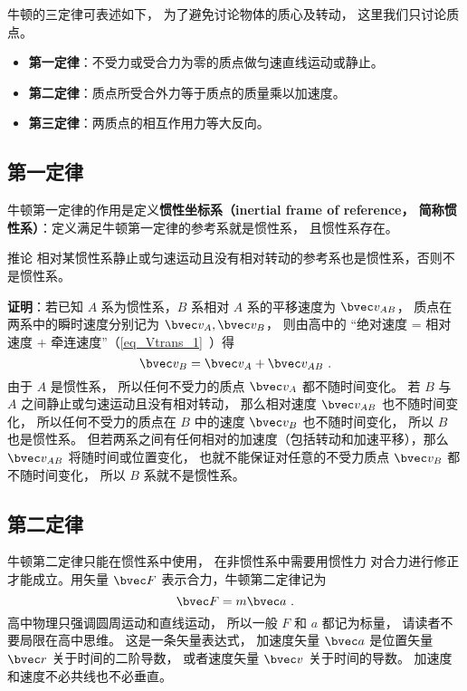 

牛顿的三定律可表述如下， 为了避免讨论物体的质心及转动， 这里我们只讨论质点。
\begin{itemize}
\item \textbf{第一定律}：不受力或受合力为零的质点做匀速直线运动或静止。
\item \textbf{第二定律}：质点所受合外力等于质点的质量乘以加速度。
\item \textbf{第三定律}：两质点的相互作用力等大反向。
\end{itemize}

\subsection{第一定律}

牛顿第一定律的作用是定义\textbf{惯性坐标系（inertial frame of reference， 简称惯性系）}：定义满足牛顿第一定律的参考系就是惯性系， 且惯性系存在。

\begin{corollary}{推论}
相对某惯性系静止或匀速运动且没有相对转动的参考系也是惯性系，否则不是惯性系。
\end{corollary}
\textbf{证明}：若已知 $A$ 系为惯性系，$B$ 系相对 $A$ 系的平移速度为 $\bvec v_{AB}$， 质点在两系中的瞬时速度分别记为 $\bvec v_A, \bvec v_B$， 则由高中的 “绝对速度 = 相对速度 + 牵连速度”（\autoref{eq_Vtrans_1}~）得
\begin{equation}
\bvec v_{B} = \bvec v_{A} + \bvec v_{AB}~.
\end{equation}
由于 $A$ 是惯性系， 所以任何不受力的质点 $\bvec v_{A}$ 都不随时间变化。 若 $B$ 与 $A$ 之间静止或匀速运动且没有相对转动， 那么相对速度 $\bvec v_{AB}$ 也不随时间变化， 所以任何不受力的质点在 $B$ 中的速度 $\bvec v_{B}$ 也不随时间变化， 所以 $B$ 也是惯性系。 但若两系之间有任何相对的加速度（包括转动和加速平移），那么 $\bvec v_{AB}$ 将随时间或位置变化， 也就不能保证对任意的不受力质点 $\bvec v_B$ 都不随时间变化， 所以 $B$ 系就不是惯性系。

\subsection{第二定律}

牛顿第二定律只能在惯性系中使用， 在非惯性系中需要用惯性力 对合力进行修正才能成立。用矢量 $\bvec F$ 表示合力，牛顿第二定律记为
\begin{equation}\label{eq_New3_1}
\bvec F = m\bvec a~.
\end{equation}
高中物理只强调圆周运动和直线运动， 所以一般 $F$ 和 $a$ 都记为标量， 请读者不要局限在高中思维。 这是一条矢量表达式， 加速度矢量 $\bvec a$ 是位置矢量 $\bvec r$ 关于时间的二阶导数， 或者速度矢量 $\bvec v$ 关于时间的导数。 加速度和速度不必共线也不必垂直。

